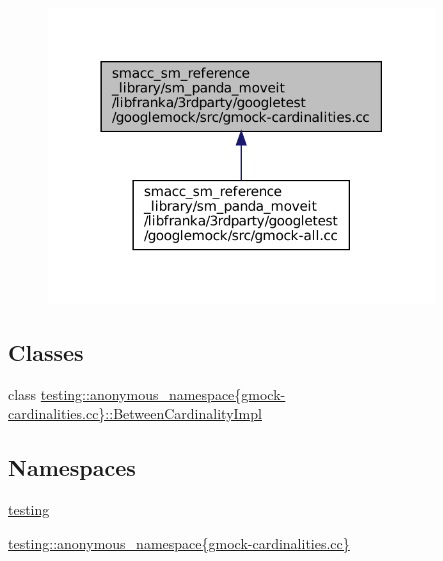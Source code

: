 \begin{figure}[H]
\begin{center}
\leavevmode
\includegraphics[width=290pt]{gmock-cardinalities_8cc__dep__incl}
\end{center}
\end{figure}
\subsection*{Classes}
\begin{DoxyCompactItemize}
\item 
class \hyperlink{classtesting_1_1anonymous__namespace_02gmock-cardinalities_8cc_03_1_1BetweenCardinalityImpl}{testing\+::anonymous\+\_\+namespace\{gmock-\/cardinalities.\+cc\}\+::\+Between\+Cardinality\+Impl}
\end{DoxyCompactItemize}
\subsection*{Namespaces}
\begin{DoxyCompactItemize}
\item 
 \hyperlink{namespacetesting}{testing}
\item 
 \hyperlink{namespacetesting_1_1anonymous__namespace_02gmock-cardinalities_8cc_03}{testing\+::anonymous\+\_\+namespace\{gmock-\/cardinalities.\+cc\}}
\end{DoxyCompactItemize}

